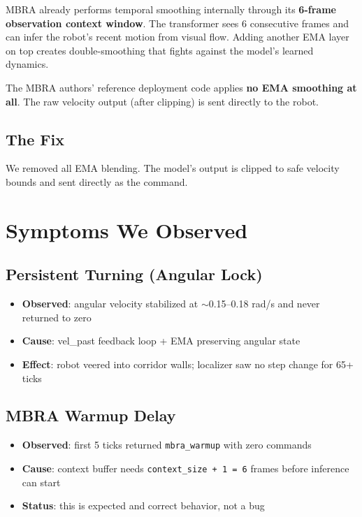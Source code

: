 \documentclass[11pt,a4paper]{article}
\begin{document}
MBRA already performs temporal smoothing internally through its
\textbf{6-frame observation context window}.  The transformer sees 6
consecutive frames and can infer the robot's recent motion from visual flow.
Adding another EMA layer on top creates double-smoothing that fights against
the model's learned dynamics.

The MBRA authors' reference deployment code applies \textbf{no EMA smoothing at
all}.  The raw velocity output (after clipping) is sent directly to the robot.

\subsection{The Fix}

We removed all EMA blending.  The model's output is clipped to safe velocity
bounds and sent directly as the command.

\section{Symptoms We Observed}

\subsection{Persistent Turning (Angular Lock)}

\begin{itemize}[nosep]
  \item \textbf{Observed}: angular velocity stabilized at $\sim$0.15--0.18
    rad/s and never returned to zero
  \item \textbf{Cause}: vel\_past feedback loop + EMA preserving angular state
  \item \textbf{Effect}: robot veered into corridor walls; localizer saw no
    step change for 65+ ticks
\end{itemize}

\subsection{MBRA Warmup Delay}

\begin{itemize}[nosep]
  \item \textbf{Observed}: first 5 ticks returned \texttt{mbra\_warmup} with
    zero commands
  \item \textbf{Cause}: context buffer needs \texttt{context\_size + 1 = 6}
    frames before inference can start
  \item \textbf{Status}: this is expected and correct behavior, not a bug
\end{itemize}
\end{document}

